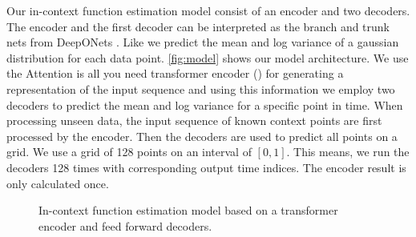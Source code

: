 Our in-context function estimation model consist of an encoder and two decoders. The encoder and the first decoder can be interpreted as the branch and trunk nets from DeepONets \citet{Lu_2021}. Like \citet{seifner2025zeroshotimputationfoundationinference} we predict the mean and log variance of a gaussian distribution for each data point. \autoref{fig:model} shows our model architecture. We use the Attention is all you need transformer encoder (\citet{vaswani2017attention}) for generating a representation of the input sequence and using this information we employ two decoders to predict the mean and log variance for a specific point in time. When processing unseen data, the input sequence of known context points are first processed by the encoder. Then the decoders are used to predict all points on a grid. We use a grid of 128 points on an interval of $[0,1]$. This means, we run the decoders 128 times with corresponding output time indices. The encoder result is only calculated once. 

\label{impl:model}
	\begin{figure}
		\centering
	\label{fig:model}
	\caption{In-context function estimation model based on a transformer encoder and feed forward decoders.}
\end{figure}

